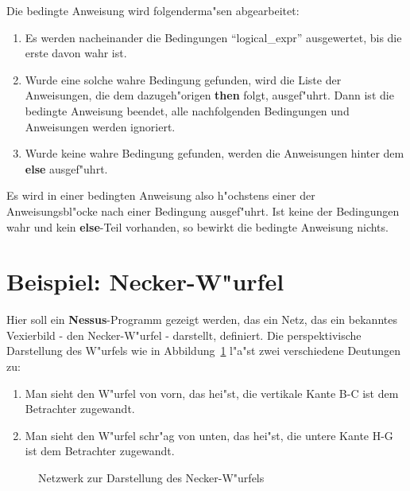 Die bedingte Anweisung wird folgenderma"sen  abgearbeitet:
\begin{enumerate}
  \item Es werden nacheinander die Bedingungen ``logical\_expr'' ausgewertet, bis die erste davon
	wahr ist.
  \item Wurde eine solche wahre Bedingung gefunden, wird die Liste der Anweisungen, die dem
	dazugeh"origen {\bf then} folgt, ausgef"uhrt. Dann ist die bedingte Anweisung beendet,
	alle nachfolgenden Bedingungen und Anweisungen werden ignoriert.
  \item Wurde keine wahre Bedingung gefunden, werden die Anweisungen hinter dem {\bf else}
	ausgef"uhrt. 
\end{enumerate}

Es wird in einer bedingten Anweisung also h"ochstens einer der
Anweisungsbl"ocke nach einer Bedingung ausgef"uhrt. Ist keine der
Bedingungen wahr und kein {\bf else}-Teil vorhanden, so bewirkt die
bedingte Anweisung nichts.





\section{Beispiel: Necker-W"urfel}
\label{NeckerBsp}

Hier soll ein {\bf Nessus}-Programm gezeigt werden, das ein Netz, das
ein bekanntes Vexierbild - den Necker-W"urfel - darstellt, definiert.
Die perspektivische Darstellung des W"urfels wie in
Abbildung~\ref{WuerfelBild} l"a"st zwei verschiedene Deutungen zu:

\begin{enumerate}
  \item Man sieht den W"urfel von vorn, das hei"st, die vertikale Kante B-C ist dem Betrachter zugewandt.
  \item Man sieht den W"urfel schr"ag von unten, das hei"st, die untere Kante H-G ist dem Betrachter zugewandt.
\end{enumerate}

\begin{figure}[htb]
  \begin{center}
      \begin{minipage}{\textwidth}
      \end{minipage}
    \caption{\label{WuerfelBild} Netzwerk zur Darstellung des Necker-W"urfels}
  \end{center}
\end{figure}

